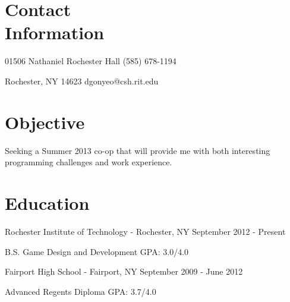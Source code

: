 \documentclass[letterpaper,margin,line,11pt]{resume}
\newcommand{\rdate}[1]{\hfill {\small #1}}
\begin{document}
\begin{resume}
\section{\mysidestyle Contact \\ Information} 
	\begin{asparablank}
		\item 01506 Nathaniel Rochester Hall \hfill (585) 678-1194
		\item Rochester, NY 14623 \hfill dgonyeo@csh.rit.edu
	\end{asparablank}

\section{\mysidestyle Objective}
	Seeking a Summer 2013 co-op that will provide me with both interesting programming challenges and work experience.

\section{\mysidestyle Education}
	\begin{compactdesc}
		\item[Rochester Institute of Technology] - Rochester, NY \rdate{September 2012 - Present}
		\begin{compactitem} { \small
			\item B.S. Game Design and Development \hfill GPA: 3.0/4.0 \\
		} \end{compactitem}
                \item[Fairport High School] - Fairport, NY \rdate{September 2009 - June 2012}
                \begin{compactitem} {\small
                        \item Advanced Regents Diploma \hfill GPA: 3.7/4.0
                } \end{compactitem}
	\end{compactdesc}


\end{resume}
\end{document}
